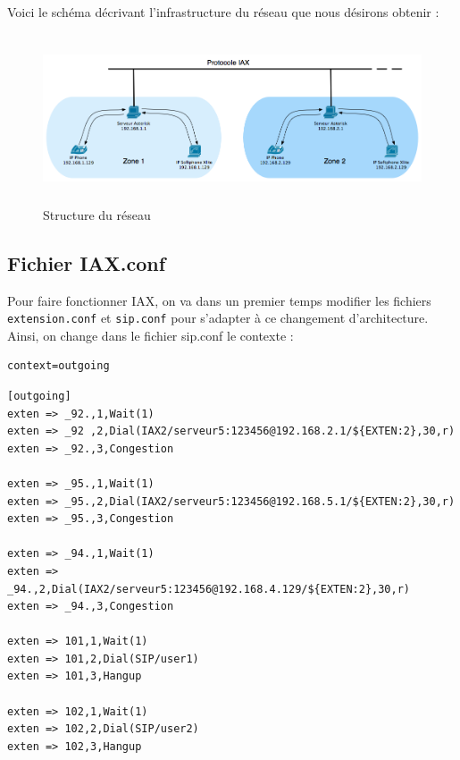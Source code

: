 \documentclass[12pt,a4paper,notitlepage]{article}
\begin{document}
\paragraph{}Voici le schéma décrivant l'infrastructure du réseau que nous désirons obtenir :

\begin{figure}[!h]
\begin{center}
\includegraphics[height=5cm]{structure_reseau_IAX}
\caption{Structure du réseau}
\label{fig:da}
\end{center}
\end{figure}


\subsection{Fichier IAX.conf}
Pour faire fonctionner IAX, on va dans un premier temps modifier les fichiers \texttt{extension.conf} et \texttt{sip.conf} pour s'adapter à ce changement d'architecture.\\

Ainsi, on change dans le fichier sip.conf le contexte : 

\begin{lstlisting}[title=Ajout au fichier sip.conf pour IAX]
context=outgoing
\end{lstlisting}

\clearpage

\begin{lstlisting}[title=Ajout au fichier extension.conf pour IAX]
[outgoing]
exten => _92.,1,Wait(1)
exten => _92 ,2,Dial(IAX2/serveur5:123456@192.168.2.1/${EXTEN:2},30,r)
exten => _92.,3,Congestion

exten => _95.,1,Wait(1)
exten => _95.,2,Dial(IAX2/serveur5:123456@192.168.5.1/${EXTEN:2},30,r)
exten => _95.,3,Congestion

exten => _94.,1,Wait(1)
exten => _94.,2,Dial(IAX2/serveur5:123456@192.168.4.129/${EXTEN:2},30,r)
exten => _94.,3,Congestion

exten => 101,1,Wait(1)
exten => 101,2,Dial(SIP/user1)
exten => 101,3,Hangup

exten => 102,1,Wait(1)
exten => 102,2,Dial(SIP/user2)
exten => 102,3,Hangup
\end{lstlisting}
\end{document}
